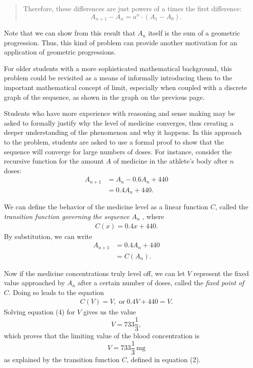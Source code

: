 {\begin{description}
\begin{quotation}
        Therefore, these differences are just powers of a times the first difference:
        $$
        A_{n+1}-A_n
          =a^n\cdot (A_1-A_0).
        $$
      \end{quotation}

      Note that we can show from this result that $A_n$ itself is the sum of a geometric progression. Thus, this kind of problem can provide another motivation for an application of geometric progressions.

      \item[Method 4.] For older students with a more sophisticated mathematical background, this problem could be revisited as a means of informally introducing them to the important mathematical concept of limit, especially when coupled with a discrete graph of the sequence, as shown in the graph on the previous page.
      
      \item[Method 5.] Students who have more experience with reasoning and sense making may be asked to formally justify why the level of medicine converges, thus creating a deeper understanding of the phenomenon and why it happens. In this approach to the problem, students are asked to use a formal proof to show that the sequence will converge for large numbers of doses. For instance, consider the recursive function for the amount $A$ of medicine in the athlete's body after $n$ doses:
      \begin{align*}
        A_{n+1}
          &=A_n-0.6A_n+440 \\
          &=0.4A_n+440. \tag{1}
      \end{align*} 

      We can define the behavior of the medicine level as a linear function $C$, called the \emph{transition function governing the sequence} $A_n$ , where
        \begin{align*}
          C(x)=0.4x+440. \tag{2}
        \end{align*} 
      By substitution, we can write
      \begin{align*}
        A_{n+1}
          &=0.4A_n+440 \\
          &=C(A_n). \tag{3}
      \end{align*} 

      Now if the medicine concentrations truly level off, we can let $V$ represent the fixed value approached by $A_n$ after a certain number of doses, called the \emph{fixed point of} $C$. Doing so leads to the equation\vspace{1.5\baselineskip}
      \begin{align*}
        C(V)=V, \; \text{or} \; 0.4V+440=V. \tag{4}
      \end{align*}
      Solving equation (4) for $V$ gives us the value
      $$
        V=733\frac{1}{3},
      $$
      which proves that the limiting value of the blood concentration is
      $$
        V=733\frac{1}{3} \, \text{mg}
      $$
      as explained by the transition function $C$, defined in equation (2).


\end{description}}
